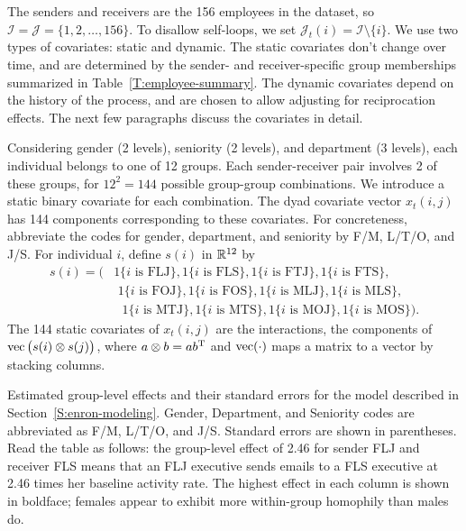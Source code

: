 \documentclass[aoas,preprint]{imsart}
\begin{document}
The senders and receivers are the 156 employees in the dataset, so
$\mathcal{I} = \mathcal{J} = \{ 1, 2, \ldots, 156 \}$.  To disallow
self-loops, we set $\mathcal{J}_t(i) = \mathcal{I} \setminus \{ i \}$.
We use two types of covariates: static and dynamic.  The static covariates
don't change over time, and are determined by the sender- and
receiver-specific group memberships summarized in
Table~\ref{T:employee-summary}.  The dynamic covariates depend on the
history of the process, and are chosen to allow adjusting for reciprocation
effects.  The next few paragraphs discuss the covariates in detail.

Considering gender (2 levels), seniority (2 levels), and department
(3 levels), each individual belongs to one of 12 groups.  Each
sender-receiver pair involves 2 of these groups, for $12^2 = 144$ possible
group-group combinations.  We introduce a static binary covariate for each
combination.  The dyad covariate vector $x_t(i,j)$ has 144 components
corresponding to these covariates.  For concreteness, abbreviate the codes
for gender, department, and seniority by F/M, L/T/O, and J/S.  For
individual $i$, define $s(i)$ in $\mathbb{R}^{12}$ by
\begin{align*}
    s(i)
    =
    \big(
        &\text{1\{$i$ is FLJ\}},
        \text{1\{$i$ is FLS\}},
        \text{1\{$i$ is FTJ\}},
        \text{1\{$i$ is FTS\}}, \\
        &\,\,\text{1\{$i$ is FOJ\}},
        \text{1\{$i$ is FOS\}},
        \text{1\{$i$ is MLJ\}},
        \text{1\{$i$ is MLS\}}, \\
        &\,\,\,\,\text{1\{$i$ is MTJ\}},
        \text{1\{$i$ is MTS\}},
        \text{1\{$i$ is MOJ\}},
        \text{1\{$i$ is MOS\}}
    \big).
\end{align*}
The 144 static covariates of $x_t(i,j)$ are the interactions,
the components of $\operatorname*{vec}\big(s(i) \otimes s(j)\big)$, where
$a \otimes b = a b^{\mathrm{T}}$ and $\operatorname*{vec}(\cdot)$ maps a matrix to a vector
by stacking columns.


\begin{table}[h]
    \tiny
    
    \caption{
        Estimated group-level effects and their standard errors for the
        model described in Section~\ref{S:enron-modeling}.  Gender,
        Department, and Seniority codes are abbreviated as F/M, L/T/O,
        and J/S.  Standard errors are shown in parentheses.  Read
        the table as follows: the group-level effect of 2.46 for sender
        FLJ and receiver FLS means that an FLJ executive sends emails to a
        FLS executive at 2.46 times her baseline activity rate.  The highest
        effect in each column is shown in boldface; females appear to
        exhibit more within-group homophily than males do.
    }
    \label{T:group-effects}
\end{table}
\end{document}
